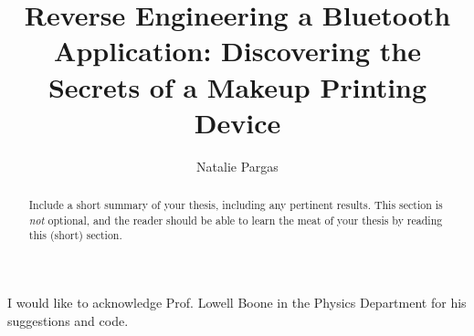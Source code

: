 \documentclass[10pt,palatino,code,picins,tikz,kaukecopyright,openright,lshortwooster,dropcaps,verbatim,index,euler]{woosterthesis}
\title{Reverse Engineering a Bluetooth Application: Discovering the Secrets of a Makeup Printing Device}
\author{Natalie Pargas}
\begin{document}
%
%

\frontmatter
\maketitle
\ClearShipoutPicture
\clearpage\thispagestyle{empty}\null\clearpage
\disscopyright 

%                                                                                       
%                                                                                       

\begin{abstract}
Include a short summary of your thesis, including any pertinent results.  This section is \emph{not} optional, and the reader should be able to learn the meat of your thesis by reading this (short) section.
\end{abstract}

%                                                                                       
%                                                                                       

\dedication{This work is dedicated to the future generations of Wooster students.}


%                                                                                       
%                                                                                       

\begin{acknowl}  
I would like to acknowledge Prof. Lowell Boone in the Physics Department for his suggestions and code.
\end{acknowl}

%                                                                                       
%                                                                                       
\end{document}
